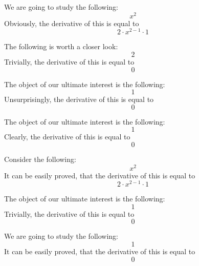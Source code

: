 \documentclass{article}
\begin{document}
We are going to study the following:
\begin{equation}
x ^{2 } 
\end{equation}
Obviously, the derivative of this is equal to
\begin{equation}
2 \cdot x ^{2 - 1 } \cdot 1 
\end{equation}

The following is worth a closer look:
\begin{equation}
2 
\end{equation}
Trivially, the derivative of this is equal to
\begin{equation}
0 
\end{equation}

The object of our ultimate interest is the following:
\begin{equation}
1 
\end{equation}
Unsurprisingly, the derivative of this is equal to
\begin{equation}
0 
\end{equation}

The object of our ultimate interest is the following:
\begin{equation}
1 
\end{equation}
Clearly, the derivative of this is equal to
\begin{equation}
0 
\end{equation}

Consider the following:
\begin{equation}
x ^{2 } 
\end{equation}
It can be easily proved, that the derivative of this is equal to
\begin{equation}
2 \cdot x ^{2 - 1 } \cdot 1 
\end{equation}

The object of our ultimate interest is the following:
\begin{equation}
1 
\end{equation}
Trivially, the derivative of this is equal to
\begin{equation}
0 
\end{equation}

We are going to study the following:
\begin{equation}
1 
\end{equation}
It can be easily proved, that the derivative of this is equal to
\begin{equation}
0 
\end{equation}
\end{document}
